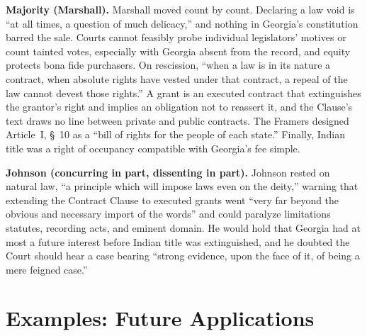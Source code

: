 \documentclass[12pt]{article}
\begin{document}
\textbf{Majority (Marshall).} Marshall moved count by count. Declaring a law void is ``at all times, a question of much delicacy,'' and nothing in Georgia's constitution barred the sale. Courts cannot feasibly probe individual legislators' motives or count tainted votes, especially with Georgia absent from the record, and equity protects bona fide purchasers. On rescission, ``when a law is in its nature a contract, when absolute rights have vested under that contract, a repeal of the law cannot devest those rights.'' A grant is an executed contract that extinguishes the grantor's right and implies an obligation not to reassert it, and the Clause's text draws no line between private and public contracts. The Framers designed Article~I, \S~10 as a ``bill of rights for the people of each state.'' Finally, Indian title was a right of occupancy compatible with Georgia's fee simple.

\textbf{Johnson (concurring in part, dissenting in part).} Johnson rested on natural law, ``a principle which will impose laws even on the deity,'' warning that extending the Contract Clause to executed grants went ``very far beyond the obvious and necessary import of the words'' and could paralyze limitations statutes, recording acts, and eminent domain. He would hold that Georgia had at most a future interest before Indian title was extinguished, and he doubted the Court should hear a case bearing ``strong evidence, upon the face of it, of being a mere feigned case.''

\section{Examples: Future Applications}
\end{document}
